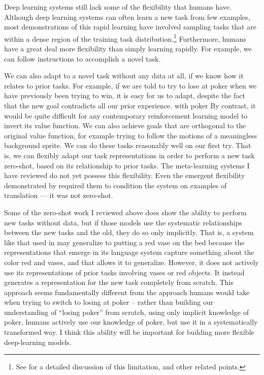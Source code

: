Deep learning systems still lack some of the flexibility that humans have. Although deep learning systems can often learn a new task from few examples, most demonstrations of this rapid learning have involved sampling tasks that are within a dense region of the training task distribution.\footnote{See \citet{Chollet2019} for a detailed discussion of this limitation, and other related points.} Furthermore, humans have a great deal more flexibility than simply learning rapidly. For example, we can follow instructions to accomplish a novel task. \par
We can also adapt to a novel task without any data at all, if we know how it relates to prior tasks. For example, if we are told to try to lose at poker when we have previously been trying to win, it is easy for us to adapt, despite the fact that the new goal contradicts all our prior experience. with poker By contrast, it would be quite difficult for any contemporary reinforcement learning model to invert its value function. We can also achieve goals that are orthogonal to the original value function, for example trying to follow the motions of a meaningless background sprite. We can do these tasks reasonably well on our first try. That is, we can flexibly adapt our task representations in order to perform a new task zero-shot, based on its relationship to prior tasks. The meta-learning systems I have reviewed do not yet possess this flexibility. Even the emergent flexibility demonstrated by \citet{Radford2019} required them to condition the system on examples of translation --- it was not zero-shot. \par
Some of the zero-shot work I reviewed above does show the ability to perform new tasks without data, but if those models use the systematic relationships between the new tasks and the old, they do so only implicitly. That is, a system like that used in \citet{Hill2019a} may generalize to putting a red vase on the bed because the representations that emerge in its language system capture something about the color red and vases, and that allows it to generalize. However, it does not actively use its representations of prior tasks involving vases or red objects. It instead generates a representation for the new task completely from scratch. This approach seems fundamentally different from the approach humans would take when trying to switch to losing at poker -- rather than building our understanding of ``losing poker'' from scratch, using only implicit knowledge of poker, humans actively use our knowledge of poker, but use it in a systematically transformed way. I think this ability will be important for building more flexible deep-learning models.  \par

